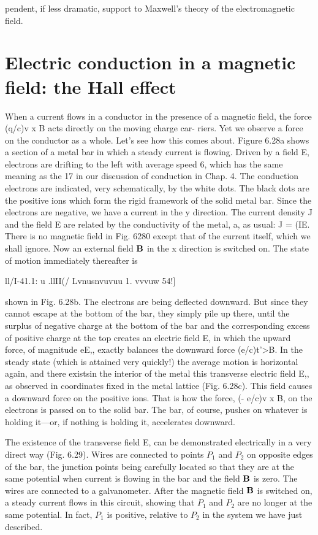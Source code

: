 pendent, if less dramatic, support to Maxwell's theory of the electromagnetic
field.

\section{Electric conduction in a magnetic field: the Hall effect}

When a current flows in a conductor in the presence of a magnetic
field, the force (q/c)v x B acts directly on the moving charge car-
riers. Yet we observe a force on the conductor as a whole. Let's
see how this comes about. Figure 6.28a shows a section of a metal
bar in which a steady current is flowing. Driven by a field E, electrons
are drifting to the left with average speed 6, which has the same
meaning as the 17 in our discussion of conduction in Chap. 4. The
conduction electrons are indicated, very schematically, by the white
dots. The black dots are the positive ions which form the rigid framework
of the solid metal bar. Since the electrons are negative, we have
a current in the y direction. The current density J and the field E
are related by the conductivity of the metal, a, as usual: J = (IE.
There is no magnetic field in Fig. 6280 except that of the current
itself, which we shall ignore. Now an external field $\mathbf{B}$ in the x direction
is switched on. The state of motion immediately thereafter is

\/ll/I-41.1: u .llII(/ Lvnusnvuvuu 1. vvvuw 54!]

shown in Fig. 6.28b. The electrons are being deflected downward.
But since they cannot escape at the bottom of the bar, they simply
pile up there, until the surplus of negative charge at the bottom of the
bar and the corresponding excess of positive charge at the top creates
an electric field E, in which the upward force, of magnitude eE,,
exactly balances the downward force (e/c)t'>B. In the steady state
(which is attained very quickly!) the average motion is horizontal
again, and there existsin the interior of the metal this transverse
electric field E,, as observed in coordinates fixed in the metal lattice
(Fig. 6.28c). This field causes a downward force on the positive
ions. That is how the force, (- e/c)v x B, on the electrons is passed
on to the solid bar. The bar, of course, pushes on whatever is holding
it---or, if nothing is holding it, accelerates downward.

The existence of the transverse field E, can be demonstrated electrically
in a very direct way (Fig. 6.29). Wires are connected to
points $P_1$ and $P_2$ on opposite edges of the bar, the junction points
being carefully located so that they are at the same potential when
current is flowing in the bar and the field $\mathbf{B}$ is zero. The wires are
connected to a galvanometer. After the magnetic field $\mathbf{B}$ is switched
on, a steady current flows in this circuit, showing that $P_1$ and $P_2$ are
no longer at the same potential. In fact, $P_1$ is positive, relative to $P_2$
in the system we have just described.

